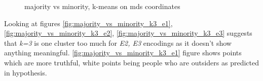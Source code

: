 \documentclass[a4paper,12pt]{article}
\begin{document}
	\begin{figure}[!tbp]
		\centering
		\hfill
		\hfill
		\caption{majority vs minority, \gls{k-means} on \acrshort{mds} coordinates}
	\end{figure}
	
	\clearpage
	
	Looking at figures \ref{fig:majority_vs_minority_k3_e1},\ref{fig:majority_vs_minority_k3_e2}, \ref{fig:majority_vs_minority_k3_e3} suggests that \textit{k=3} is one cluster too much for \textit{E2, E3} encodings as it doesn't show anything meaningful. \ref{fig:majority_vs_minority_k3_e1} figure shows points which are more truthful, white points being people who are outsiders as predicted in hypothesis. 
	
\end{document}
